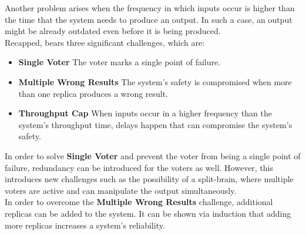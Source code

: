 Another problem arises when the frequency in which inputs occur is higher than the time that the system needs to produce an output.
In such a case, an output might be already outdated even before it is being produced.
\\

\noindent
Recapped,  bears three significant challenges, which are:

\newcommand{\ChallengeWR}{\textbf{Multiple Wrong Results}\xspace}
\newcommand{\ChallengeVoter}{\textbf{Single Voter}\xspace}
\newcommand{\ChallengeThrough}{\textbf{Throughput Cap}\xspace}
\begin{itemize}
\item \ChallengeVoter The voter marks a single point of failure.
\item \ChallengeWR The system's safety is compromised when more than one replica produces a wrong result.
\item \ChallengeThrough When inputs occur in a higher frequency than the system's throughput time, delays happen that can compromise the system's safety.
\end{itemize}

\noindent
In order to solve \ChallengeVoter and prevent the voter from being a single point of failure, redundancy can be introduced for the voters as well.
However, this introduces new challenges such as the possibility of a split-brain, where multiple voters are active and can manipulate the output simultaneously.
\\

\noindent
In order to overcome the \ChallengeWR challenge, additional replicas can be added to the system.
It can be shown via induction that adding more replicas increases a system's reliability.

